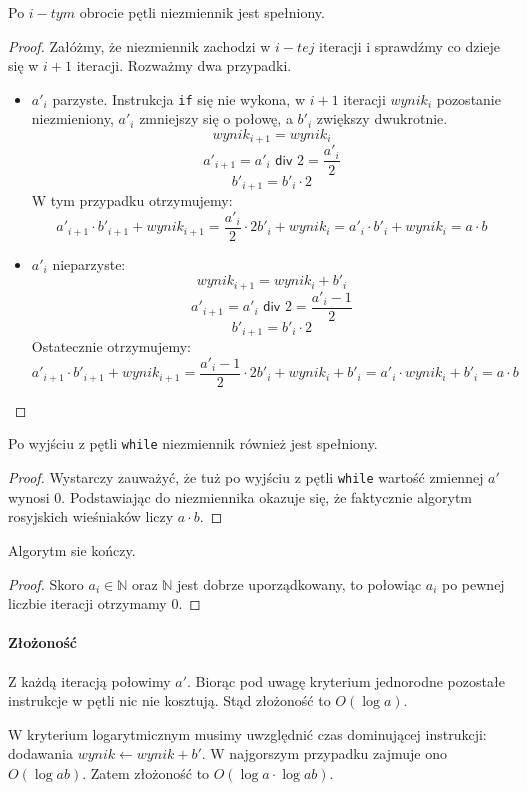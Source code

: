 \begin{lemma}
Po $i-tym$ obrocie pętli niezmiennik jest spełniony.
\end{lemma}
\begin{proof}
Załóżmy, że niezmiennik zachodzi w $i-tej$ iteracji i sprawdźmy co dzieje się w $i+1$ iteracji.
Rozważmy dwa przypadki.


\begin{itemize}
    \item $a'_i$ parzyste. Instrukcja \texttt{if} się nie wykona, w $i+1$ iteracji $wynik_i$ pozostanie niezmieniony, $a'_i$ zmniejszy się o połowę, a $b'_i$ zwiększy dwukrotnie. 
    \[
      wynik_{i+1} = wynik_i
    \]
    \[
      a'_{i+1} = a'_i \textsf{ div } 2 = \frac{a'_i}{2}
    \]
    \[
      b'_{i+1} = b'_i \cdot 2
    \]
    W tym przypadku otrzymujemy:
    \[
      a'_{i+1} \cdot b'_{i+1} + wynik_{i+1} = \frac{a'_i}{2} \cdot 2 b'_i + wynik_i = a'_i \cdot b'_i + wynik_i = a \cdot b
    \]

    \item $a'_i$ nieparzyste:
    \[
      wynik_{i+1} = wynik_i + b'_i
    \]
    \[
      a'_{i+1} = a'_i \textsf{ div } 2 = \frac{a'_i-1}{2}
    \]
    \[
      b'_{i+1} = b'_i \cdot 2
    \]
    Ostatecznie otrzymujemy:
    \[
      a'_{i+1} \cdot b'_{i+1} + wynik_{i+1} = \frac{a'_i-1}{2} \cdot 2 b'_i + wynik_i +b'_i = a'_i \cdot wynik_i + b'_i= a \cdot b
    \]

\end{itemize}

\end{proof}

\begin{lemma}
Po wyjściu z pętli \texttt{while} niezmiennik również jest spełniony.
\end{lemma}
\begin{proof}
Wystarczy zauważyć, że tuż po wyjściu z pętli \texttt{while} wartość zmiennej $a'$ wynosi $0$.
Podstawiając do niezmiennika okazuje się, że faktycznie algorytm rosyjskich wieśniaków liczy $a \cdot b$.
\end{proof}

\begin{lemma}
Algorytm sie kończy.
\end{lemma}
\begin{proof}
Skoro $a_i \in \mathbb{N} $ oraz $\mathbb{N}$ jest dobrze uporządkowany, to połowiąc $a_i$ po pewnej liczbie iteracji otrzymamy 0.
\end{proof}


\paragraph{Złożoność}

Z każdą iteracją połowimy $a'$. 
Biorąc pod uwagę kryterium jednorodne pozostałe instrukcje w pętli nic nie kosztują. 
Stąd złożoność to $O(\log a)$.

W kryterium logarytmicznym musimy uwzględnić czas dominującej instrukcji: dodawania  $wynik \leftarrow wynik + b'$. 
W najgorszym przypadku zajmuje ono $O(\log ab)$. Zatem złożoność to $O(\log a \cdot \log ab)$.

